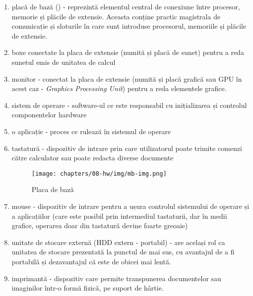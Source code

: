 \begin{enumerate}
\item placă de bază () - reprezintă elementul central de conexiune între
          procesor, memorie și plăcile de extensie. Aceasta conține
          practic magistrala de comunicație și sloturile în care sunt
          introduse procesorul, memoriile și plăcile de extensie.

  \item boxe conectate la placa de extensie (numită și placă de sunet)
          pentru a reda sunetul emis de unitatea de calcul
  \item monitor - conectat la placa de extensie (numită și placă grafică
    sau GPU  în acest caz - \textit{Graphics Processing Unit})
          pentru a reda elementele grafice.
  \item sistem de operare - software-ul ce este responsabil cu
          inițializarea și controlul componentelor hardware
  \item o aplicație - proces ce rulează în sistemul de operare
  \item tastatură - dispozitiv de intrare prin care utilizatorul poate trimite
          comenzi către calculator sau poate redacta diverse documente

\begin{figure}[!htbp]
  \centering
  \texttt{[image: chapters/08-hw/img/mb-img.png]}
  \caption{Placa de bază\protect\footnotemark}
  \label{fig:hw:mb}
\end{figure}

  \item mouse - dispozitiv de intrare pentru a ușura controlul sistemului
          de operare și a aplicațiilor (care este posibil prin intermediul
          tastaturii, dar în medii grafice, operarea doar din tastatură
          devine foarte greoaie)
  \item unitate de stocare externă (HDD extern - portabil) - are
          același rol ca unitatea de stocare prezentată la punctul de mai sus,
          cu avantajul de a fi portabilă și dezavantajul că este de obicei
          mai lentă.
  \item imprimantă - dispozitiv care permite transpunerea documentelor
          sau imaginilor într-o formă fizică, pe suport de hârtie.

\end{enumerate}

